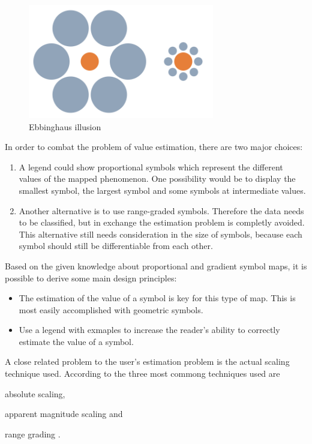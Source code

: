 \begin{figure}[!htb]
\centering
\includegraphics[height=5cm,keepaspectratio]{images/psm/ebbinghaus.png}
\caption[
    Ebbinghaus illusion, Urldate: 07.2016 \newline
    \small\texttt{\url{https://upload.wikimedia.org/wikipedia/commons/b/bc/Mond-vergleich.svg}}
]{Ebbinghaus illusion}
\label{fig:ebbinghaus}
\end{figure}

In order to combat the problem of value estimation, there are two major choices:
\begin{enumerate}
\item A legend could show proportional symbols which represent the different values of the mapped phenomenon. One possibility would be to display the smallest symbol, the largest symbol and some symbols at intermediate values.
\item Another alternative is to use range-graded symbols. Therefore the data needs to be classified, but in exchange the estimation problem is completly avoided. This alternative still needs consideration in the size of symbols, because each symbol should still be differentiable from each other.
\end{enumerate}

Based on the given knowledge about proportional and gradient symbol maps, it is possible to derive some main design principles:
\begin{itemize}
\item The estimation of the value of a symbol is key for this type of map. This is most easily accomplished with geometric symbols.
\item Use a legend with exmaples to increase the reader's ability to correctly estimate the value of a symbol.
\end{itemize}

A close related problem to the user's estimation problem is the actual scaling technique used. According to \citeauthor{Dent2008} the three most commong techniques used are
\begin{enumerate*}
\item absolute scaling,
\item apparent magnitude scaling and
\item range grading .
\end{enumerate*}

